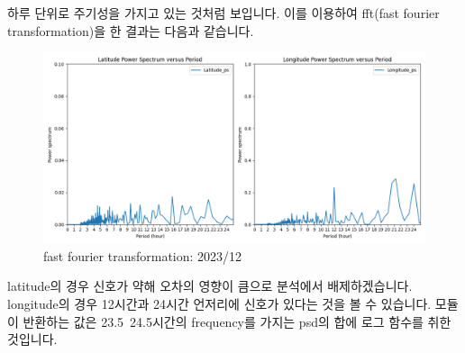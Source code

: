 \documentclass{oblivoir}
\begin{document}
  하루 단위로 주기성을 가지고 있는 것처럼 보입니다.
  이를 이용하여 fft(fast fourier transformation)을 한 결과는 다음과 같습니다.
  \begin{figure}[H]
    \centering
    \caption{fast fourier transformation: 2023/12}
    \includegraphics[width=\textwidth]{GPS_feature_8.png}
  \end{figure}
  latitude의 경우 신호가 약해 오차의 영향이 큼으로 분석에서 배제하겠습니다.
  longitude의 경우 12시간과 24시간 언저리에 신호가 있다는 것을 볼 수 있습니다.
  모듈이 반환하는 값은 23.5~24.5시간의 frequency를 가지는 psd의 합에 로그 함수를 취한 것입니다.
\end{document}
